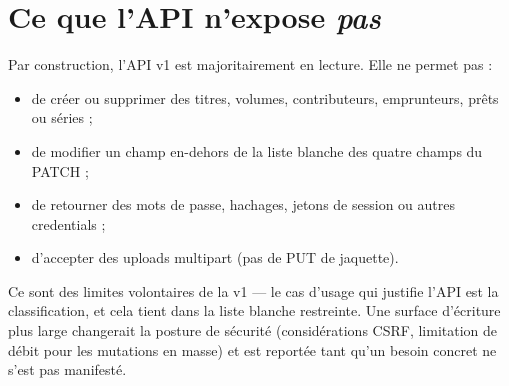 \section{Ce que l'API n'expose \emph{pas}}

Par construction, l'API v1 est majoritairement en lecture. Elle
ne permet pas :

\begin{itemize}
  \item de créer ou supprimer des titres, volumes, contributeurs,
        emprunteurs, prêts ou séries ;
  \item de modifier un champ en-dehors de la liste blanche des
        quatre champs du PATCH ;
  \item de retourner des mots de passe, hachages, jetons de
        session ou autres credentials ;
  \item d'accepter des uploads multipart (pas de PUT de jaquette).
\end{itemize}

Ce sont des limites volontaires de la v1 — le cas d'usage qui
justifie l'API est la classification, et cela tient dans la liste
blanche restreinte. Une surface d'écriture plus large changerait la
posture de sécurité (considérations CSRF, limitation de débit pour
les mutations en masse) et est reportée tant qu'un besoin concret
ne s'est pas manifesté.
